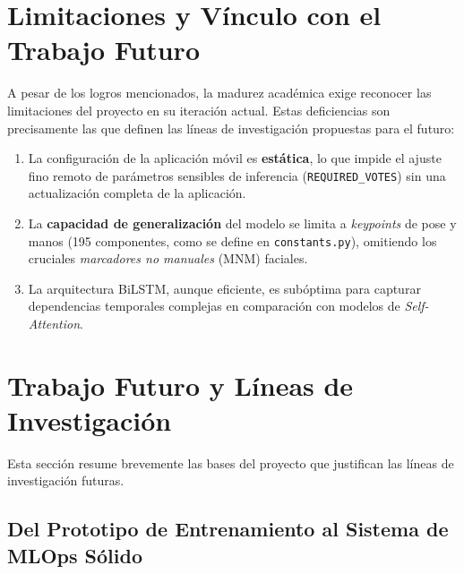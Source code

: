 \section{Limitaciones y Vínculo con el Trabajo Futuro}
\label{sec:limitaciones_futuro}
\par A pesar de los logros mencionados, la madurez académica exige reconocer las limitaciones del proyecto en su iteración actual. Estas deficiencias son precisamente las que definen las líneas de investigación propuestas para el futuro:
\begin{enumerate}
    \item La configuración de la aplicación móvil es \textbf{estática}, lo que impide el ajuste fino remoto de parámetros sensibles de inferencia (\lstinline|REQUIRED_VOTES|) sin una actualización completa de la aplicación.
    \item La \textbf{capacidad de generalización} del modelo se limita a \textit{keypoints} de pose y manos (195 componentes, como se define en \lstinline|constants.py|), omitiendo los cruciales \textit{marcadores no manuales} (MNM) faciales.
    \item La arquitectura BiLSTM, aunque eficiente, es subóptima para capturar dependencias temporales complejas en comparación con modelos de \textit{Self-Attention}.
\end{enumerate}


\section{Trabajo Futuro y Líneas de Investigación}


\par Esta sección resume brevemente las bases del proyecto que justifican las líneas de investigación futuras.

\subsection{Del Prototipo de Entrenamiento al Sistema de MLOps Sólido}

